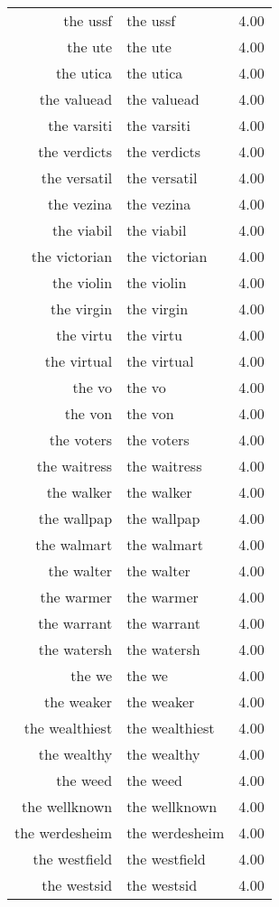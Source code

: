 \begin{table}[ht]
\begin{tabular}{rlr}
  the ussf & the ussf & 4.00 \\ 
  the ute & the ute & 4.00 \\ 
  the utica & the utica & 4.00 \\ 
  the valuead & the valuead & 4.00 \\ 
  the varsiti & the varsiti & 4.00 \\ 
  the verdicts & the verdicts & 4.00 \\ 
  the versatil & the versatil & 4.00 \\ 
  the vezina & the vezina & 4.00 \\ 
  the viabil & the viabil & 4.00 \\ 
  the victorian & the victorian & 4.00 \\ 
  the violin & the violin & 4.00 \\ 
  the virgin & the virgin & 4.00 \\ 
  the virtu & the virtu & 4.00 \\ 
  the virtual & the virtual & 4.00 \\ 
  the vo & the vo & 4.00 \\ 
  the von & the von & 4.00 \\ 
  the voters & the voters & 4.00 \\ 
  the waitress & the waitress & 4.00 \\ 
  the walker & the walker & 4.00 \\ 
  the wallpap & the wallpap & 4.00 \\ 
  the walmart & the walmart & 4.00 \\ 
  the walter & the walter & 4.00 \\ 
  the warmer & the warmer & 4.00 \\ 
  the warrant & the warrant & 4.00 \\ 
  the watersh & the watersh & 4.00 \\ 
  the we & the we & 4.00 \\ 
  the weaker & the weaker & 4.00 \\ 
  the wealthiest & the wealthiest & 4.00 \\ 
  the wealthy & the wealthy & 4.00 \\ 
  the weed & the weed & 4.00 \\ 
  the wellknown & the wellknown & 4.00 \\ 
  the werdesheim & the werdesheim & 4.00 \\ 
  the westfield & the westfield & 4.00 \\ 
  the westsid & the westsid & 4.00 \\ 

\end{tabular}
\end{table}
